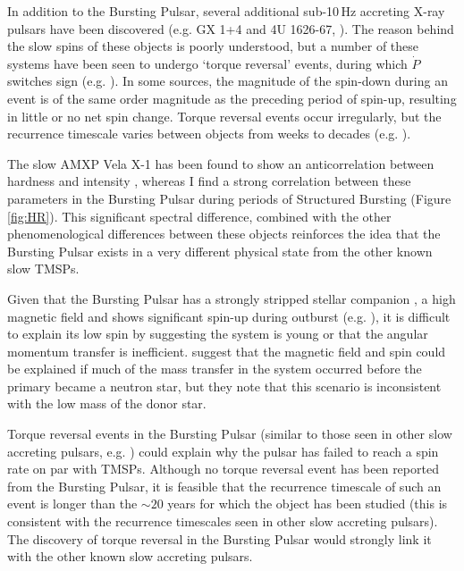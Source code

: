 \par In addition to the Bursting Pulsar, several additional sub-10\,Hz accreting X-ray pulsars have been discovered (e.g. GX 1+4 and 4U 1626-67, \citealp{Lewin_GX1,Rappaport_4U}). The reason behind the slow spins of these objects is poorly understood, but a number of these systems have been seen to undergo `torque reversal' events, during which $\dot{P}$ switches sign (e.g. \citealp{Chakrabarty_4U,Chakrabarty_GX14}). In some sources, the magnitude of the spin-down during an event is of the same order magnitude as the preceding period of spin-up, resulting in little or no net spin change. Torque reversal events occur irregularly, but the recurrence timescale varies between objects from weeks to decades (e.g. \citealp{Bildsten_Rev}).
\par The slow AMXP Vela X-1 has been found to show an anticorrelation between hardness and intensity \citep{Kreykenbohm_Vela}, whereas I find a strong correlation between these parameters in the Bursting Pulsar during periods of Structured Bursting (Figure \ref{fig:HR}). This significant spectral difference, combined with the other phenomenological differences between these objects reinforces the idea that the Bursting Pulsar exists in a very different physical state from the other known slow TMSPs.
\par Given that the Bursting Pulsar has a strongly stripped stellar companion \citep{Bildsten_Nuclear}, a high magnetic field and shows significant spin-up during outburst (e.g. \citealp{Finger_BP,Sanna_BP}), it is difficult to explain its low spin by suggesting the system is young or that the angular momentum transfer is inefficient. \citealp{Rappaport_BPHistory} suggest that the magnetic field and spin could be explained if much of the mass transfer in the system occurred before the primary became a neutron star, but they note that this scenario is inconsistent with the low mass of the donor star.
\par Torque reversal events in the Bursting Pulsar (similar to those seen in other slow accreting pulsars, e.g. \citealp{Bildsten_Rev}) could explain why the pulsar has failed to reach a spin rate on par with TMSPs. Although no torque reversal event has been reported from the Bursting Pulsar, it is feasible that the recurrence timescale of such an event is longer than the $\sim20$ years for which the object has been studied (this is consistent with the recurrence timescales seen in other slow accreting pulsars). The discovery of torque reversal in the Bursting Pulsar would strongly link it with the other known slow accreting pulsars. %

